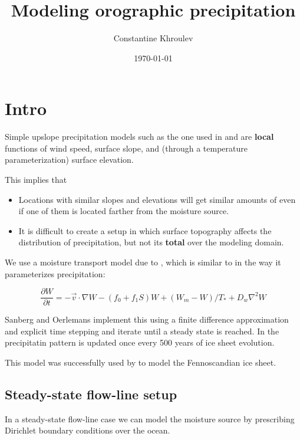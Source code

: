 \documentclass[11pt]{article}
\author{Constantine Khroulev}
\date{\today}
\title{Modeling orographic precipitation}
\begin{document}
\maketitle
\tableofcontents


\section{Intro}
\label{sec-1}

Simple upslope precipitation models such as the one used in
\cite{roe2003orographic} and \cite{roe1999wobbly} are \textbf{local}
functions of wind speed, surface slope, and (through a temperature
parameterization) surface elevation.

This implies that
\begin{itemize}
\item Locations with similar slopes and elevations will get similar
amounts of even if one of them is located farther from the
moisture source.
\item It is difficult to create a setup in which surface topography
affects the distribution of precipitation, but not its \textbf{total}
over the modeling domain.
\end{itemize}

We use a moisture transport model due to
\cite{sanberg1983modelling}, which is similar to
\cite{roe2003orographic} in the way it parameterizes precipitation:

\begin{equation}
\frac{\partial W}{\partial t} = -\vec v \cdot \nabla W - (f_0 + f_1 S) W + (W_m - W) / T_{*} + D_w \nabla^2 W
\end{equation}

Sanberg and Oerlemans implement this using a finite difference
approximation and explicit time stepping and iterate until a steady
state is reached. In \cite{sanberg1983modelling} the precipitatin
pattern is updated once every 500 years of ice sheet evolution.

This model was successfully used by \cite{letreguilly1993modelling}
to model the Fennoscandian ice sheet.

\subsection{Steady-state flow-line setup}
\label{sec-1-1}

In a steady-state flow-line case we can model the moisture source
by prescribing Dirichlet boundary conditions over the ocean.
\end{document}
